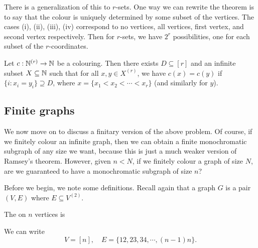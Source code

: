 \documentclass[a4paper]{article}
\begin{document}
There is a generalization of this to $r$-sets. One way we can rewrite the theorem is to say that the colour is uniquely determined by some subset of the vertices. The cases (i), (ii), (iii), (iv) correspond to no vertices, all vertices, first vertex, and second vertex respectively. Then for $r$-sets, we have $2^r$ possibilities, one for each subset of the $r$-coordinates.

\begin{thm}
  Let $c: \mathbb{N}^{(r)} \to \mathbb{N}$ be a colouring. Then there exists $D \subseteq [r]$ and an infinite subset $X \subseteq \mathbb{N}$ such that for all $x, y \in X^{(r)}$, we have $c(x) = c(y)$ if $\{i: x_i = y_i\} \supseteq D$, where $x = \{x_1 < x_2 < \cdots < x_r\}$ (and similarly for $y$).
\end{thm}

\subsection{Finite graphs}
We now move on to discuss a finitary version of the above problem. Of course, if we finitely colour an infinite graph, then we can obtain a finite monochromatic subgraph of any size we want, because this is just a much weaker version of Ramsey's theorem. However, given $n < N$, if we finitely colour a graph of size $N$, are we guaranteed to have a monochromatic subgraph of size $n$?

Before we begin, we note some definitions. Recall again that a graph $G$ is a pair $(V, E)$ where $E \subseteq V^{(2)}$.
\begin{eg}
  The  on $n$ vertices  is
  \begin{center}
  \end{center}
  We can write
  \[
    V = [n],\quad E = \{12, 23, 34, \cdots, (n-1)n\}.
  \]
\end{eg}
\end{document}
